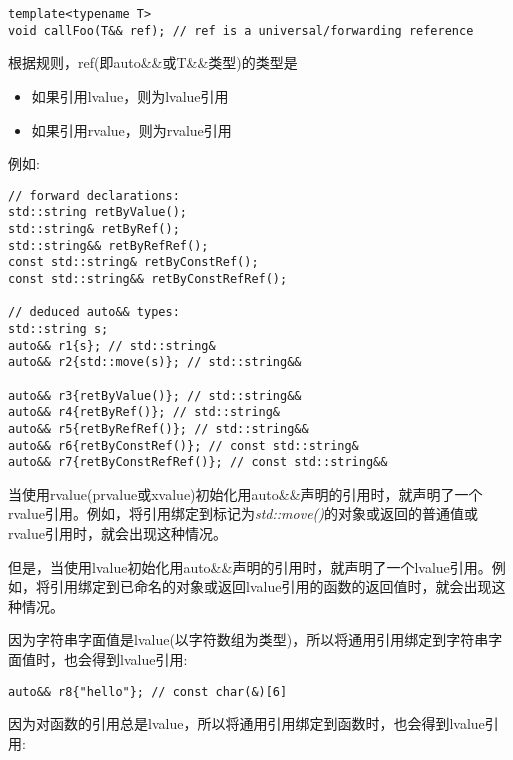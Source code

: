 \begin{lstlisting}[caption={}]
template<typename T>
void callFoo(T&& ref); // ref is a universal/forwarding reference
\end{lstlisting}

根据规则，ref(即auto\&\&或T\&\&类型)的类型是\par

\begin{itemize}
	\item 如果引用lvalue，则为lvalue引用
	\item 如果引用rvalue，则为rvalue引用
\end{itemize}

例如:\par

\begin{lstlisting}[caption={}]
// forward declarations:
std::string retByValue();
std::string& retByRef();
std::string&& retByRefRef();
const std::string& retByConstRef();
const std::string&& retByConstRefRef();

// deduced auto&& types:
std::string s;
auto&& r1{s}; // std::string&
auto&& r2{std::move(s)}; // std::string&&

auto&& r3{retByValue()}; // std::string&&
auto&& r4{retByRef()}; // std::string&
auto&& r5{retByRefRef()}; // std::string&&
auto&& r6{retByConstRef()}; // const std::string&
auto&& r7{retByConstRefRef()}; // const std::string&&
\end{lstlisting}

当使用rvalue(prvalue或xvalue)初始化用auto\&\&声明的引用时，就声明了一个rvalue引用。例如，将引用绑定到标记为\textit{std::move()}的对象或返回的普通值或rvalue引用时，就会出现这种情况。\par

但是，当使用lvalue初始化用auto\&\&声明的引用时，就声明了一个lvalue引用。例如，将引用绑定到已命名的对象或返回lvalue引用的函数的返回值时，就会出现这种情况。\par

因为字符串字面值是lvalue(以字符数组为类型)，所以将通用引用绑定到字符串字面值时，也会得到lvalue引用:\par

\begin{lstlisting}[caption={}]
auto&& r8{"hello"}; // const char(&)[6]
\end{lstlisting}

因为对函数的引用总是lvalue，所以将通用引用绑定到函数时，也会得到lvalue引用:\par

